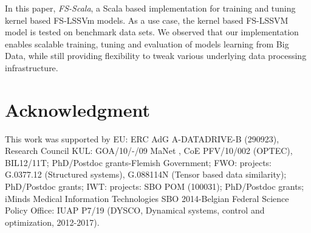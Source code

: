 \documentclass[conference, cmex10]{IEEEtran}
\begin{document}
In this paper, \textit{FS-Scala}, a Scala based implementation for training and tuning kernel based FS-LSSVm models. As a use case, the kernel based FS-LSSVM model is tested on benchmark data sets. We observed that our implementation enables scalable training, tuning and evaluation of models learning from Big Data, while still providing flexibility to tweak various underlying data processing infrastructure.




%


\appendices
\section*{Acknowledgment}
This work was supported by EU: ERC AdG A-DATADRIVE-B (290923), Research Council KUL: GOA/10/-/09 MaNet , CoE PFV/10/002 (OPTEC), BIL12/11T; PhD/Postdoc grants-Flemish Government; FWO: projects: G.0377.12 (Structured systems), G.088114N (Tensor based data similarity); PhD/Postdoc grants; IWT: projects: SBO POM (100031); PhD/Postdoc grants; iMinds Medical Information Technologies SBO 2014-Belgian Federal Science Policy Office: IUAP P7/19 (DYSCO, Dynamical systems, control and optimization, 2012-2017).


\ifCLASSOPTIONcaptionsoff
  \newpage
\fi
\end{document}
